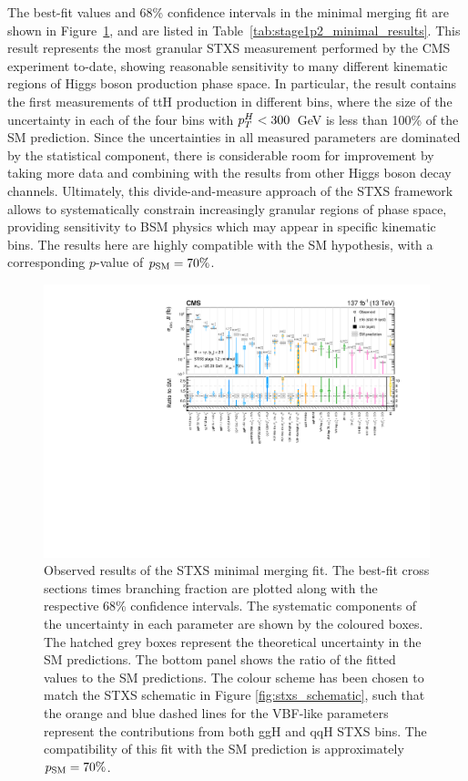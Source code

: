 The \xsbr best-fit values and 68\% confidence intervals in the minimal merging fit are shown in Figure~\ref{fig:stage1p2_minimal_results}, and are listed in Table~\ref{tab:stage1p2_minimal_results}. This result represents the most granular STXS measurement performed by the CMS experiment to-date, showing reasonable sensitivity to many different kinematic regions of Higgs boson production phase space. In particular, the result contains the first measurements of ttH production in different bins, where the size of the uncertainty in each of the four bins with $p_T^H<300$~GeV is less than 100\% of the SM prediction. Since the uncertainties in all measured parameters are dominated by the statistical component, there is considerable room for improvement by taking more data and combining with the results from other Higgs boson decay channels. Ultimately, this divide-and-measure approach of the STXS framework allows to systematically constrain increasingly granular regions of phase space, providing sensitivity to BSM physics which may appear in specific kinematic bins. The results here are highly compatible with the SM hypothesis, with a corresponding $p$-value of $p_{\rm{SM}}=70\%$.

\begin{figure}[htb!]
  \centering
  \hspace*{-1.3cm}
  \includegraphics[width=1.2\textwidth]{Figures/hgg_results/stage1p2_minimal_summary.pdf}
  \hspace*{-1.3cm}
  \caption[Results of the minimal merging fit]
  {
    Observed results of the STXS minimal merging fit. The best-fit cross sections times branching fraction are plotted along with the respective 68\% confidence intervals. The systematic components of the uncertainty in each parameter are shown by the coloured boxes. The hatched grey boxes represent the theoretical uncertainty in the SM predictions. The bottom panel shows the ratio of the fitted values to the SM predictions. The colour scheme has been chosen to match the STXS schematic in Figure \ref{fig:stxs_schematic}, such that the orange and blue dashed lines for the VBF-like parameters represent the contributions from both ggH and qqH STXS bins. The compatibility of this fit with the SM prediction is approximately $p_{\rm{SM}}=70\%$. 
  }
  \label{fig:stage1p2_minimal_results}
\end{figure}

